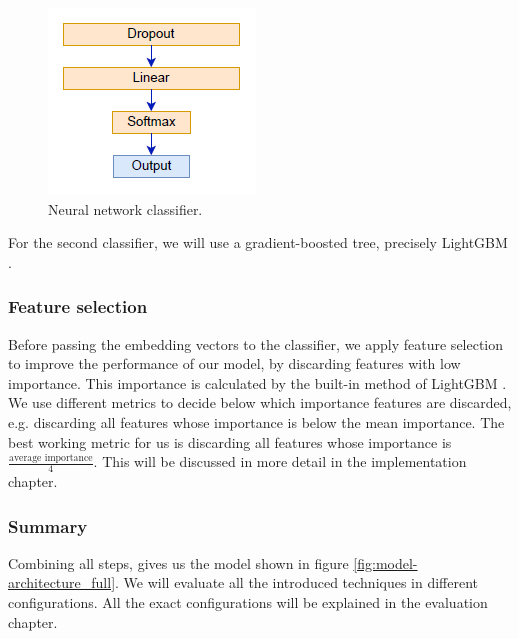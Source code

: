 \begin{figure}[h]
  \centering
  \includegraphics[scale=1]{fig/nn_1.png}
  \caption{Neural network classifier.}%
  \label{fig:nn1}
\end{figure}

For the second classifier, we will use a gradient-boosted tree, precisely LightGBM \cite{lgbm}.

\subsubsection{Feature selection}
Before passing the embedding vectors to the classifier, we apply feature selection to improve the performance of our model, by discarding features with low importance. This importance is calculated by the built-in method of LightGBM \cite{lgbmimportance}. We use different metrics to decide below which importance features are discarded, e.g. discarding all features whose importance is below the mean importance. The best working metric for us is discarding all features whose importance is $\frac{\text{average importance}}{4}$. This will be discussed in more detail in the implementation chapter.

\subsubsection{Summary}
Combining all steps, gives us the model shown in figure \ref{fig:model-architecture_full}. We will evaluate all the introduced techniques in different configurations. All the exact configurations will be explained in the evaluation chapter.

